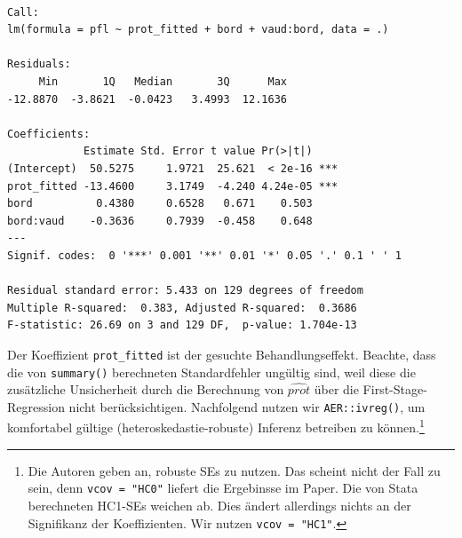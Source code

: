 \documentclass[
  a4paper,
  DIV=11,
  oneside]{scrreprt}
\begin{document}
\begin{verbatim}

Call:
lm(formula = pfl ~ prot_fitted + bord + vaud:bord, data = .)

Residuals:
     Min       1Q   Median       3Q      Max 
-12.8870  -3.8621  -0.0423   3.4993  12.1636 

Coefficients:
            Estimate Std. Error t value Pr(>|t|)    
(Intercept)  50.5275     1.9721  25.621  < 2e-16 ***
prot_fitted -13.4600     3.1749  -4.240 4.24e-05 ***
bord          0.4380     0.6528   0.671    0.503    
bord:vaud    -0.3636     0.7939  -0.458    0.648    
---
Signif. codes:  0 '***' 0.001 '**' 0.01 '*' 0.05 '.' 0.1 ' ' 1

Residual standard error: 5.433 on 129 degrees of freedom
Multiple R-squared:  0.383, Adjusted R-squared:  0.3686 
F-statistic: 26.69 on 3 and 129 DF,  p-value: 1.704e-13
\end{verbatim}

Der Koeffizient \texttt{prot\_fitted} ist der gesuchte
Behandlungseffekt. Beachte, dass die von \texttt{summary()} berechneten
Standardfehler ungültig sind, weil diese die zusätzliche Unsicherheit
durch die Berechnung von \(\widehat{prot}\) über die
First-Stage-Regression nicht berücksichtigen. Nachfolgend nutzen wir
\texttt{AER::ivreg()}, um komfortabel gültige (heteroskedastie-robuste)
Inferenz betreiben zu können.\footnote{Die Autoren geben an, robuste SEs
  zu nutzen. Das scheint nicht der Fall zu sein, denn
  \texttt{vcov\ =\ "HC0"} liefert die Ergebinsse im Paper. Die von Stata
  berechneten HC1-SEs weichen ab. Dies ändert allerdings nichts an der
  Signifikanz der Koeffizienten. Wir nutzen \texttt{vcov\ =\ "HC1"}.}
\end{document}
